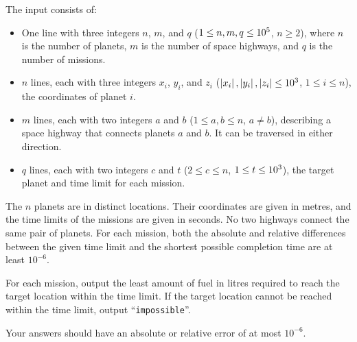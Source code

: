 \begin{Input}
  The input consists of:
  \begin{itemize}
    \item One line with three integers $n$, $m$, and $q$ ($1 \le n,m,q \le 10^5$, $n \ge 2$),
      where $n$ is the number of planets, $m$ is the number of space highways, and $q$ is the number of missions.
    \item $n$ lines, each with three integers $x_i$, $y_i$, and $z_i$ ($\left|x_i\right|,\left|y_i\right|,\left|z_i\right| \le 10^3$, $1 \le i \le n$), the coordinates of planet $i$.
    \item $m$ lines, each with two integers $a$ and $b$ ($1 \le a,b \le n$, $a \neq b$), describing a space highway that connects planets $a$ and $b$. It can be traversed in either direction.
    \item $q$ lines, each with two integers $c$ and $t$ ($2 \le c \le n$, $1 \le t \le 10^3$), the target planet and time limit for each mission.
  \end{itemize}
  The $n$ planets are in distinct locations.
  Their coordinates are given in metres, and the time limits of the missions are given in seconds.
  No two highways connect the same pair of planets.
  For each mission, both the absolute and relative differences between the given time limit and the shortest possible completion time are at least $10^{-6}$.
\end{Input}

\begin{Output}
  For each mission, output the least amount of fuel in litres required to reach the target location within the time limit.
  If the target location cannot be reached within the time limit, output ``\texttt{impossible}''.

  Your answers should have an absolute or relative error of at most $10^{-6}$.
\end{Output}
